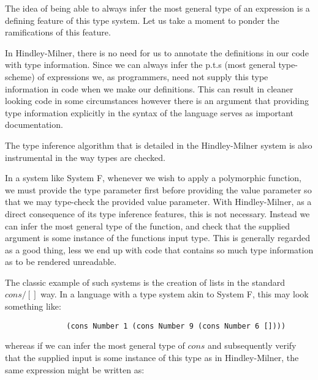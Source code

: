 \documentclass{ProgressReport}[2020/09/15]
\begin{document}
            The idea of being able to always infer the most general type of an
            expression is a defining feature of this type system. Let us take a
            moment to ponder the ramifications of this feature.
            
            In Hindley-Milner, there is no need for us to annotate the definitions
            in our code with type information. Since we can always
            infer the p.t.s (most general type-scheme) of expressions
            we, as programmers, need not supply this type information
            in code when we make our definitions. This can result in
            cleaner looking code in some circumstances however there
            is an argument that providing type information explicitly
            in the syntax of the language serves as important documentation.
                        
            The type inference algorithm that is detailed in the Hindley-Milner
            system is also instrumental in the way types are checked.
            
            In a system like System F, whenever we wish to apply a polymorphic
            function, we must provide the type parameter first before providing
            the value parameter so that we may type-check the provided value
            parameter. With Hindley-Milner, as a direct consequence of its type
            inference features, this is not necessary. Instead we can infer the
            most general type of the function, and check that the supplied
            argument is some instance of the functions input type. This is
            generally regarded as a good thing, less we end up with code that
            contains so much type information as to be rendered
            unreadable.
            
            The classic example of such systems is the creation of lists in the
            standard $cons/[]$ way. In a language with a type system akin to
            System F, this may look
            something like:
            
            \begin{verbatim}
              (cons Number 1 (cons Number 9 (cons Number 6 [])))  
            \end{verbatim}
            
            whereas if we can infer the most general type of $cons$ and
            subsequently verify that the supplied input is some instance of this
            type as in Hindley-Milner, the same expression might be written as:
            
\end{document}

